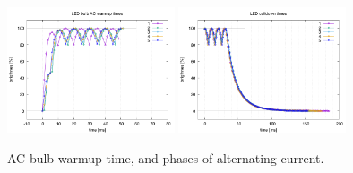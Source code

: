 \begin{figure}[h]
\centering
\includegraphics[height=140px]{img/warmup2}
\includegraphics[height=140px]{img/warmdown2}
\caption{AC bulb warmup time, and phases of alternating current.}
\label{fig:warmupAC}
\end{figure}
